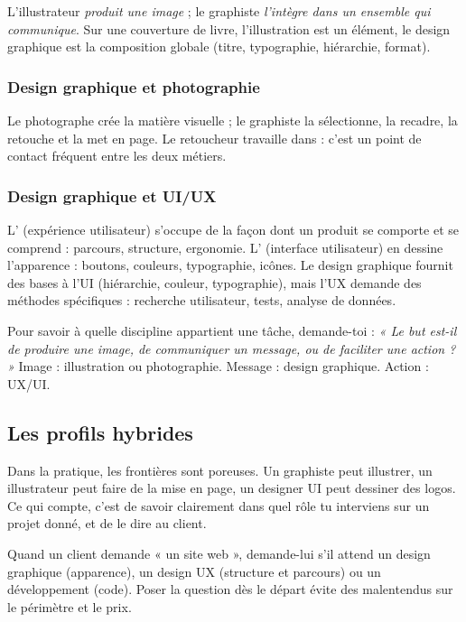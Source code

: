 L'illustrateur \emph{produit une image} ; le graphiste \emph{l'intègre dans un ensemble qui communique}. Sur une couverture de livre, l'illustration est un élément, le design graphique est la composition globale (titre, typographie, hiérarchie, format).

\subsubsection{Design graphique et photographie}

Le photographe crée la matière visuelle ; le graphiste la sélectionne, la recadre, la retouche et la met en page. Le retoucheur travaille dans  : c'est un point de contact fréquent entre les deux métiers.

\subsubsection{Design graphique et UI/UX}

L' (expérience utilisateur) s'occupe de la façon dont un produit se comporte et se comprend : parcours, structure, ergonomie. L' (interface utilisateur) en dessine l'apparence : boutons, couleurs, typographie, icônes. Le design graphique fournit des bases à l'UI (hiérarchie, couleur, typographie), mais l'UX demande des méthodes spécifiques : recherche utilisateur, tests, analyse de données.

\begin{defbox}
Pour savoir à quelle discipline appartient une tâche, demande-toi : \emph{« Le but est-il de produire une image, de communiquer un message, ou de faciliter une action ? »} Image : illustration ou photographie. Message : design graphique. Action : UX/UI.
\end{defbox}

\subsection{Les profils hybrides}

Dans la pratique, les frontières sont poreuses. Un graphiste peut illustrer, un illustrateur peut faire de la mise en page, un designer UI peut dessiner des logos. Ce qui compte, c'est de savoir clairement dans quel rôle tu interviens sur un projet donné, et de le dire au client.

\begin{astuce}
Quand un client demande « un site web », demande-lui s'il attend un design graphique (apparence), un design UX (structure et parcours) ou un développement (code). Poser la question dès le départ évite des malentendus sur le périmètre et le prix.
\end{astuce}

